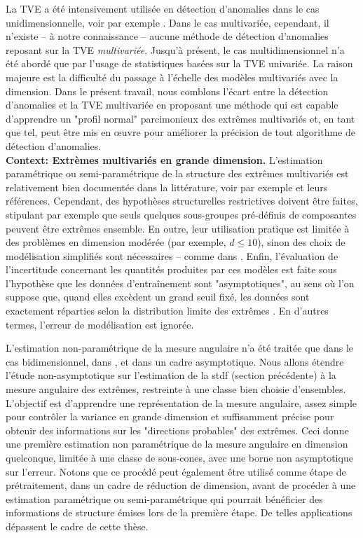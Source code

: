 La TVE a été intensivement utilisée en détection d'anomalies dans le cas unidimensionnelle, voir par exemple \cite{Roberts99, Roberts2000, Clifton2011, Clifton2008, Lee2008}. Dans le cas multivariée, cependant, il n'existe -- à notre connaissance -- aucune méthode de détection d'anomalies reposant sur la TVE \textit {multivariée}. Jusqu'à présent, le cas multidimensionnel n'a été abordé que par l'usage de statistiques basées sur la TVE univariée. La raison majeure est la difficulté du passage à l'échelle des modèles multivariés avec la dimension. Dans le présent travail, nous comblons l'écart entre la détection d'anomalies et la TVE multivariée en proposant une méthode qui est capable d'apprendre un "profil normal" parcimonieux des extrêmes multivariés et, en tant que tel, peut être mis en œuvre pour améliorer la précision de tout algorithme de détection d'anomalies.\\


\textbf{Context: Extrèmes multivariés en grande dimension.}
L'estimation paramétrique ou semi-paramétrique de la structure des extrêmes multivariés est relativement bien documentée dans la littérature, voir par exemple
\cite{coles1991modeling,fougeres2009models,cooley2010pairwise,sabourinNaveau2012} 
et leurs références. Cependant, des hypothèses structurelles restrictives doivent être faites, stipulant par exemple que seuls quelques sous-groupes pré-définis de composantes peuvent être extrêmes ensemble. %
En outre, leur utilisation pratique est limitée à des problèmes en dimension modérée (par exemple, $ d \le 10 $), sinon des choix de modélisation simplifiés sont nécessaires -- comme dans \cite {stephenson2009high}. Enfin, l'évaluation de l'incertitude concernant les quantités produites par ces modèles est faite sous l'hypothèse que les données d'entraînement sont "asymptotiques", au sens où l'on suppose que, quand elles excèdent un grand seuil fixé, les données sont exactement réparties selon la distribution limite des extrêmes . En d'autres termes, l'erreur de modélisation est ignorée.


L'estimation non-paramétrique de la mesure angulaire n'a été traitée que dans le cas bidimensionnel, dans \cite{Einmahl2001, Einmahl2009}, et dans un cadre asymptotique. Nous allons étendre l'étude non-asymptotique sur l'estimation de la {\sc stdf} (section précédente) à la mesure angulaire des extrêmes, restreinte à une classe bien choisie d'ensembles. L'objectif est d'apprendre une représentation de la mesure angulaire, assez simple pour contrôler la variance en grande dimension et suffisamment précise pour obtenir des informations sur les "directions probables" des extrêmes. Ceci donne une première estimation non paramétrique de la mesure angulaire en dimension quelconque, limitée à une classe de sous-cones, avec une borne non asymptotique sur l'erreur.
Notons que ce procédé peut également être utilisé comme étape de prétraitement, dans un cadre de réduction de  dimension, avant de procéder à une estimation paramétrique ou semi-paramétrique qui pourrait bénéficier des informations de structure émises lors de la première étape. De telles applications dépassent le cadre de cette thèse.

